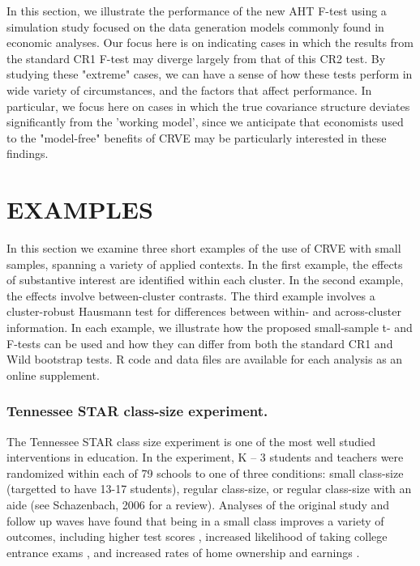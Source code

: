 \documentclass[12pt]{article}
\begin{document}
In this section, we illustrate the performance of the new AHT F-test using a simulation study focused on the data generation models commonly found in economic analyses.
Our focus here is on indicating cases in which the results from the standard CR1 F-test may diverge largely from that of this CR2 test.
By studying these "extreme" cases, we can have a sense of how these tests perform in wide variety of circumstances, and the factors that affect performance.
In particular, we focus here on cases in which the true covariance structure deviates significantly from the 'working model', since we anticipate that economists used to the "model-free" benefits of CRVE may be particularly interested in these findings. 




\section{EXAMPLES}
\label{subsec:examples_F}


In this section we examine three short examples of the use of CRVE with small samples, spanning a variety of applied contexts. In the first example, the effects of substantive interest are identified within each cluster. In the second example, the effects involve between-cluster contrasts. The third example involves a cluster-robust Hausmann test for differences between within- and across-cluster information. In each example, we illustrate how the proposed small-sample t- and F-tests can be used and how they can differ from both the standard CR1 and Wild bootstrap tests. R code and data files are available for each analysis as an online supplement.

\subsubsection{Tennessee STAR class-size experiment.} 

The Tennessee STAR class size experiment is one of the most well studied interventions in education.  In the experiment, K – 3 students and teachers were randomized within each of 79 schools to one of three conditions: small class-size (targetted to have 13-17 students), regular class-size, or regular class-size with an aide (see Schazenbach, 2006 for a review). Analyses of the original study and follow up waves have found that being in a small class improves a variety of outcomes, including higher test scores \citep{Schanzenbach2006what}, increased likelihood of taking college entrance exams \citep{Krueger2001effect}, and increased rates of home ownership and earnings \citep{Chetty2011how}. 
\end{document}
